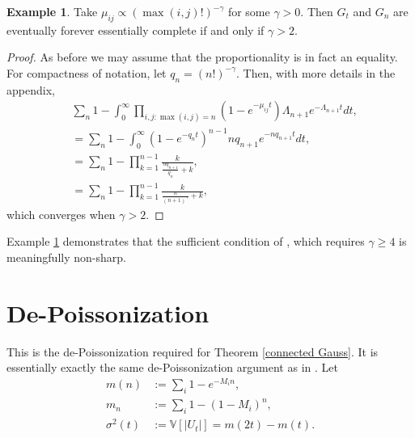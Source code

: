 \documentclass[12pt]{article}
\theoremstyle{definition}
\newtheorem{example}[proposition]{Example}
\begin{document}
\begin{example} \label{completeness example}
    Take $\mu_{ij} \propto (\max(i,j)!)^{-\gamma}$ for some $\gamma > 0$. Then $G_t$ and $G_n$ are eventually forever essentially complete if and only if $\gamma > 2$.
\end{example}    
    
\begin{proof}
    As before we may assume that the proportionality is in fact an equality. For compactness of notation, let $q_n = (n!)^{-\gamma}$. Then, with more details in the appendix,
    \begin{align*}
        &\sum_n 1-\int_{0}^\infty \prod_{i,j: \max(i,j)=n}(1-e^{-\mu_{ij}t})\Lambda_{n+1} e^{-\Lambda_{n+1}t}dt, \\
        &= \sum_n 1-\int_0^\infty (1-e^{-q_nt})^{n-1}nq_{n+1}e^{-nq_{n+1} t} dt, \\
        &=  \sum_n 1-\prod_{k=1}^{n-1} \frac{k}{\frac{nq_{n+1}}{q_n}+k}, \\
        &= \sum_n1-\prod_{k=1}^{n-1}\frac{k}{\frac{n}{(n+1)^\gamma}+k},
    \end{align*}
    which converges when $\gamma > 2$.
\end{proof}
Example \ref{completeness example} demonstrates that the sufficient condition of \cite{janson_2017_on}, which requires $\gamma \geq 4$ is meaningfully non-sharp.

\printbibliography


\appendix
\section{De-Poissonization}
This is the de-Poissonization required for Theorem \ref{connected Gauss}. It is essentially exactly the same de-Poissonization argument as in \cite{dutko_1989_central}. Let
\begin{align*}
    m(n) &:= \sum_i 1-e^{-M_i n}, \\
    m_n &:= \sum_i 1-(1-M_i)^n, \\
    \sigma^2(t) &:= \mathbb{V}[|U_t|] = m(2t)-m(t).
\end{align*}
\end{document}
